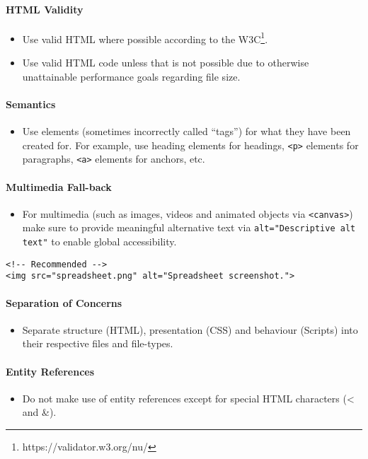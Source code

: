 \documentclass[a4paper, 11pt]{article}
\begin{document}
\paragraph{HTML Validity}
\begin{itemize}
\item Use valid HTML where possible according to the W3C\footnote{https://validator.w3.org/nu/}.
\item Use valid HTML code unless that is not possible due to otherwise unattainable performance goals regarding file size.
\end{itemize}

\paragraph{Semantics}
\begin{itemize}
\item Use elements (sometimes incorrectly called “tags”) for what they have been created for. For example, use heading elements for headings, \texttt{<p>} elements for paragraphs, \texttt{<a>} elements for anchors, etc.
\end{itemize}

\paragraph{Multimedia Fall-back}
\begin{itemize}
\item For multimedia (such as images, videos and animated objects via \texttt{<canvas>}) make sure to provide meaningful alternative text via \texttt{alt="Descriptive alt text"} to enable global accessibility.
\end{itemize}
\begin{verbatim}
<!-- Recommended -->
<img src="spreadsheet.png" alt="Spreadsheet screenshot.">
\end{verbatim}

\paragraph{Separation of Concerns}
\begin{itemize}
\item Separate structure (HTML), presentation (CSS) and behaviour (Scripts) into their respective files and file-types.
\end{itemize}

\paragraph{Entity References}
\begin{itemize}
\item Do not make use of entity references except for special HTML characters (< and \&).
\end{itemize}
\end{document}
